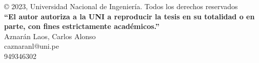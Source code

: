 \begin{permisos}
	\onehalfspacing  %

	© 2023, Universidad Nacional de Ingeniería. Todos los derechos reservados \\
	\textbf{``El autor autoriza a la UNI a reproducir la tesis en su totalidad o en parte, con fines estrictamente académicos.''} \\
	Aznarán Laos, Carlos Alonso \\
	caznaranl@uni.pe \\
	949346302

	\singlespacing  %
\end{permisos}
